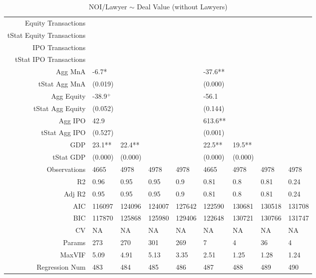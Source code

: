 \begin{table}[ht]
\begin{tabular}{rllllllll}
  Equity Transactions &  &  &  &  &  &  &  &  \\ 
  tStat Equity Transactions &  &  &  &  &  &  &  &  \\ 
  IPO Transactions &  &  &  &  &  &  &  &  \\ 
  tStat IPO Transactions &  &  &  &  &  &  &  &  \\ 
  Agg MnA & -6.7* &  &  &  & -37.6** &  &  &  \\ 
  tStat Agg MnA & (0.019) &  &  &  & (0.000) &  &  &  \\ 
  Agg Equity & -38.9$^{+}$ &  &  &  & -56.1 &  &  &  \\ 
  tStat Agg Equity & (0.052) &  &  &  & (0.144) &  &  &  \\ 
  Agg IPO & 42.9 &  &  &  & 613.6** &  &  &  \\ 
  tStat Agg IPO & (0.527) &  &  &  & (0.001) &  &  &  \\ 
  GDP & 23.1** & 22.4** &  &  & 22.5** & 19.5** &  &  \\ 
  tStat GDP & (0.000) & (0.000) &  &  & (0.000) & (0.000) &  &  \\ 
  Observations & 4665 & 4978 & 4978 & 4978 & 4665 & 4978 & 4978 & 4978 \\ 
  R2 & 0.96 & 0.95 & 0.95 & 0.9 & 0.81 & 0.8 & 0.81 & 0.24 \\ 
  Adj R2 & 0.95 & 0.95 & 0.95 & 0.9 & 0.81 & 0.8 & 0.81 & 0.24 \\ 
  AIC & 116097 & 124096 & 124007 & 127642 & 122590 & 130681 & 130518 & 131708 \\ 
  BIC & 117870 & 125868 & 125980 & 129406 & 122648 & 130721 & 130766 & 131747 \\ 
  CV & NA & NA & NA & NA & NA & NA & NA & NA \\ 
  Params & 273 & 270 & 301 & 269 & 7 & 4 & 36 & 4 \\ 
  MaxVIF & 5.09 & 4.91 & 5.13 & 3.35 & 2.51 & 1.25 & 1.28 & 1.24 \\ 
  Regression Num & 483 & 484 & 485 & 486 & 487 & 488 & 489 & 490 \\ 
   \hline
\end{tabular}
\caption{NOI/Lawyer $\sim$ Deal Value (without Lawyers)} 
\end{table}
